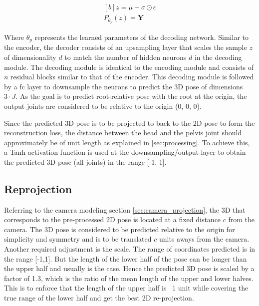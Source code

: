 \begin{equation} \label{eqn:P_fn}
    \begin{gathered}[b]
        z = \mu + \sigma \odot \epsilon \\
        P_{\theta_p}(z) = \textbf{Y}
    \end{gathered}
\end{equation}

Where $\theta_p$ represents the learned parameters of the decoding network. Similar to the encoder, the decoder consists of an upsampling layer that scales the sample $z$ of dimensionality $d$ to match the number of hidden neurons $d$ in the decoding module. The decoding module is identical to the encoding module and consists of $n$ residual blocks similar to that of the encoder. This decoding module is followed by a \ac{fc} layer to downsample the neurons to predict the 3D pose of dimensions $3\!\cdot\!J$. As the goal is to predict root-relative pose with the root at the origin, the output joints are considered to be relative to the origin (0, 0, 0).

Since the predicted 3D pose is to be projected to back to the 2D pose to form the reconstruction loss, the distance between the head and the pelvis joint should approximately be of unit length as explained in \ref{sec:processing}. To achieve this, a Tanh activation function is used at the downsampling/output layer to obtain the predicted 3D pose (all joints) in the range [-1, 1]. %

\subsection{Reprojection}
\label{subsec:reproject}
Referring to the camera modeling section \ref{sec:camera_projection}, the 3D that corresponds to the pre-processed 2D pose is located at a fixed distance $c$ from the camera. The 3D pose is considered to be predicted relative to the origin for simplicity and symmetry and is to be translated $c$ units aways from the camera. Another required adjustment is the scale. The range of coordinates predicted is in the range [-1,1]. But the length of the lower half of the pose can be longer than the upper half and usually is the case. Hence the predicted 3D pose is scaled by a factor of 1.3, which is the ratio of the mean length of the upper and lower halves. This is to enforce that the length of the upper half is ~1 unit while covering the true range of the lower half and get the best 2D re-projection.

